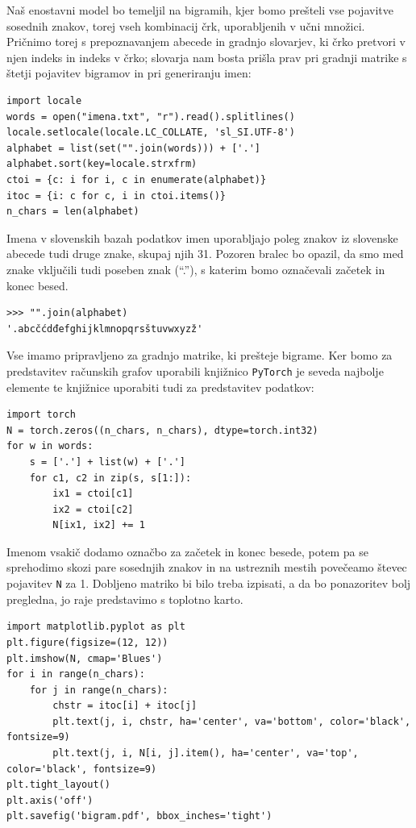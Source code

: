 Naš enostavni model bo temeljil na bigramih, kjer bomo prešteli vse pojavitve sosednih znakov, torej vseh kombinacij črk, uporabljenih v učni množici. Pričnimo torej s prepoznavanjem abecede in gradnjo slovarjev, ki črko pretvori v njen indeks in indeks v črko; slovarja nam bosta prišla prav pri gradnji matrike s štetji pojavitev bigramov in pri generiranju imen:

\vspace*{3mm}
\begin{lstlisting}
import locale
words = open("imena.txt", "r").read().splitlines()
locale.setlocale(locale.LC_COLLATE, 'sl_SI.UTF-8')
alphabet = list(set("".join(words))) + ['.']
alphabet.sort(key=locale.strxfrm)
ctoi = {c: i for i, c in enumerate(alphabet)}
itoc = {i: c for c, i in ctoi.items()}
n_chars = len(alphabet)
\end{lstlisting}

Imena v slovenskih bazah podatkov imen uporabljajo poleg znakov iz slovenske abecede tudi druge znake, skupaj njih 31. Pozoren bralec bo opazil, da smo med znake vključili tudi poseben znak (``.''), s katerim bomo označevali začetek in konec besed.

\vspace*{3mm}
\begin{lstlisting}
>>> "".join(alphabet)
'.abcčćdđefghijklmnopqrsštuvwxyzž'
\end{lstlisting}

Vse imamo pripravljeno za gradnjo matrike, ki prešteje bigrame. Ker bomo za predstavitev računskih grafov uporabili knjižnico \texttt{PyTorch} je seveda najbolje elemente te knjižnice uporabiti tudi za predstavitev podatkov:
%
\vspace*{3mm}
\begin{lstlisting}
import torch
N = torch.zeros((n_chars, n_chars), dtype=torch.int32)
for w in words:
    s = ['.'] + list(w) + ['.']
    for c1, c2 in zip(s, s[1:]):
        ix1 = ctoi[c1]
        ix2 = ctoi[c2]
        N[ix1, ix2] += 1
\end{lstlisting}

Imenom vsakič dodamo označbo za začetek in konec besede, potem pa se sprehodimo skozi pare sosednjih znakov in na ustreznih mestih povečeamo števec pojavitev \texttt{N} za 1. Dobljeno matriko bi bilo treba izpisati, a da bo ponazoritev bolj pregledna, jo raje predstavimo s toplotno karto.

\vspace*{3mm}
\begin{lstlisting}
import matplotlib.pyplot as plt
plt.figure(figsize=(12, 12)) 
plt.imshow(N, cmap='Blues')
for i in range(n_chars):
    for j in range(n_chars):
        chstr = itoc[i] + itoc[j]
        plt.text(j, i, chstr, ha='center', va='bottom', color='black', fontsize=9)
        plt.text(j, i, N[i, j].item(), ha='center', va='top', color='black', fontsize=9)
plt.tight_layout()
plt.axis('off')
plt.savefig('bigram.pdf', bbox_inches='tight')
\end{lstlisting}

